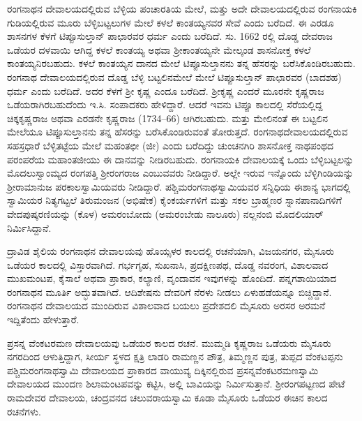 ರಂಗನಾಥನ ದೇವಾಲಯದಲ್ಲಿರುವ ಬೆಳ್ಳಿಯ ಪಂಚಾರತಿಯ ಮೇಲೆ, ಮತ್ತು ಅದೇ ದೇವಾಲಯದಲ್ಲಿರುವ ರಂಗನಾಯಕಿ ಗುಡಿಯಲ್ಲಿರುವ ಮೂರು ಬೆಳ್ಳಿಬಟ್ಟಲುಗಳ ಮೇಲೆ ಕಳಲೆ ಕಾಂತಯ್ಯನವರ ಸೇವೆ ಎಂದು ಬರೆದಿದೆ. ಈ ಎರಡೂ ಶಾಸನಗಳ ಕೆಳಗೆ ಟಿಪ್ಪೂಸುಲ್ತಾನ್​ ಪಾಛಾರವರ ಧರ್ಮ ಎಂದು ಬರೆದಿದೆ. ಸು. 1662 ರಲ್ಲಿ ದೊಡ್ಡ ದೇವರಾಜ ಒಡೆಯರ ದಳವಾಯಿ ಆಗಿದ್ದ ಕಳಲೆ ಕಾಂತಯ್ಯ ಅಥವಾ ಶ‍್ರೀಕಾಂತಯ್ಯನೇ ಮೇಲ್ಕಂಡ ಶಾಸನೋಕ್ತ ಕಳಲೆ ಕಾಂತಯ್ಯನಿರಬಹುದು. ಕಳಲೆ ಕಾಂತಯ್ಯನ ದಾನದ ಮೇಲೆ ಟಿಪ್ಪೂಸುಲ್ತಾನನು ತನ್ನ ಹೆಸರನ್ನು ಬರೆಸಿಕೊಂಡಿರಬಹುದು. ರಂಗನಾಥ ದೇವಾಲಯದಲ್ಲಿರುವ ದೊಡ್ಡ ಬೆಳ್ಳಿ ಬಟ್ಟಲಿನಮೇಲೆ ಮೇಲೆ ಟಿಪ್ಪೂಸುಲ್ತಾನ್​ ಪಾಛಾರವರ (ಬಾದಶಹ) ಧರ್ಮ ಎಂದು ಬರೆದಿದೆ. ಅದರ ಕೆಳಗೆ ಶ‍್ರೀ ಕೃಷ್ಣ ಎಂದೂ ಬರೆದಿದೆ. ಶ‍್ರೀಕೃಷ್ಣ ಎಂದರೆ ಮೂರನೇ ಕೃಷ್ಣರಾಜ ಒಡೆಯರಾಗಿರಬಹುದೆಂದು ಇ.ಸಿ. ಸಂಪಾದಕರು ಹೇಳಿದ್ದಾರೆ. ಆದರೆ ಇವನು ಟಿಪ್ಪೂ ಕಾಲದಲ್ಲಿ ಸೆರೆಯಲ್ಲಿದ್ದ ಚಿಕ್ಕಕೃಷ್ಣರಾಜ ಅಥವಾ ಎರಡನೇ ಕೃಷ್ಣರಾಜ (1734–66) ಆಗಿರಬಹುದು. ಮತ್ತು ಮೇಲಿನಂತೆ ಈ ಬಟ್ಟಲಿನ ಮೇಲೆಯೂ ಟಿಪ್ಪೂಸುಲ್ತಾನನು ತನ್ನ ಹೆಸರನ್ನು ಬರೆಸಿಕೊಂಡಿರುವಂತೆ ತೋರುತ್ತದೆ. ರಂಗನಾಥದೇವಾಲಯದಲ್ಲಿರುವ ಸಹಸ್ರಧಾರೆ ಬೆಳ್ಳಿತಟ್ಟೆಯ ಮೇಲೆ ಮಹಂತಛೀ (ಜೀ) ಎಂದು ಬರೆದಿದ್ದು ಚುಂಚನಗಿರಿ ಶಾಸನೋಕ್ತ ನಾಥಪಂಥದ ಪರಂಪರೆಯ ಮಹಾಂತಜೀಯು ಈ ದಾನವನ್ನು ನೀಡಿರಬಹುದು. ರಂಗನಾಯಕಿ ದೇವಾಲಯಕ್ಕೆ ಒಂದು ಬೆಳ್ಳಿಬಟ್ಟಲನ್ನು ಮೊದಲುಸ್ವಾಂಮ್ಯದ ರಂಗಪತ್ತಿ ಶ‍್ರೀರಂಗರಾಜ ಎಂಬುವವರು ನೀಡಿದ್ದಾರೆ. ಅಲ್ಲೇ ಇರುವ ಇನ್ನೊಂದು ಬೆಳ್ಳಿಗಿಂಡಿಯನ್ನು ಶ‍್ರೀರಾಮಾನುಜ ಪರಕಾಲಸ್ವಾಮಿಯವರು ನೀಡಿದ್ದಾರೆ. ಪಶ್ಚಿಮರಂಗನಾಥಸ್ವಾಮಿಯವರ ಸನ್ನಿಧಿಯ ಈಶಾನ್ಯ ಭಾಗದಲ್ಲಿ ಸ್ವಾಮಿಯರ ನಿತ್ಯಗಟ್ಟಲೆ ತಿರುಮಂಜನ (ಅಭಿಷೇಕ) ಕೈಂಕರ್ಯಗಳಿಗೆ ಮತ್ತು ಸಕಲ ಬ್ರಾಹ್ಮಣರ ಸ್ನಾನಪಾನಾದಿಗಳಿಗೆ ವೇದಪುಷ್ಕರಣಿಯನ್ನು (ಕೊಳ) ಅಮರಂಬೋದು (ಅಮರಂಬೇಡು ನಾಲೂರು) ನಲ್ಲನಂಬಿ ಮೊದಲಿಯಾರ್​ ನಿರ್ಮಿಸಿದ್ದಾನೆ.

ದ್ರಾವಿಡ ಶೈಲಿಯ ರಂಗನಾಥನ ದೇವಾಲಯವು ಹೊಯ್ಸಳರ ಕಾಲದಲ್ಲಿ ರಚನೆಯಾಗಿ, ವಿಜಯನಗರ, ಮೈಸೂರು ಒಡೆಯರ ಕಾಲದಲ್ಲಿ ವಿಸ್ತಾರವಾಗಿದೆ. ಗರ್ಭಗೃಹ, ಸುಖನಾಸಿ, ಪ್ರದಕ್ಷಿಣಪಥ, ದೊಡ್ಡ ನವರಂಗ, ವಿಶಾಲವಾದ ಮುಖಮಂಟಪ, ಕೈಸಾಲೆ ಅಥವಾ ಪ್ರಾಕಾರ, ಕಲ್ಯಾಣಿ, ವೃಂದಾವನ ಇವುಗಳನ್ನು ಹೊಂದಿದೆ. ಪನ್ನಗಶಾಯಿಯಾದ ರಂಗನಾಥನ ಮೂರ್ತಿ ಅದ್ಭುತವಾಗಿದೆ. ಆದಿಶೇಷನು ದೇವರಿಗೆ ನೆರಳು ನೀಡಲು ಏಳುಹಡೆಯನ್ನೂ ಬಿಚ್ಚಿದ್ದಾನೆ. ರಂಗನಾಥನ ದೇವಾಲಯದ ಮುಂದಿರುವ ವಿಶಾಲವಾದ ಬಯಲು ಪ್ರದೇಶದಲಿ ಮೈಸೂರು ಅರಸರ ಅರಮನೆ ಇದ್ದಿತೆಂದು ಹೇಳುತ್ತಾರೆ.

ಪ್ರಸನ್ನ ವೆಂಕಟರಮಣ ದೇವಾಲಯವು ಒಡೆಯರ ಕಾಲದ ರಚನೆ. ಮುಮ್ಮಡಿ ಕೃಷ್ಣರಾಜ ಒಡೆಯರು ಮೈಸೂರು ನಗರದಿಂದ ಆಳುತ್ತಿದ್ದಾಗ, ಸೀರ್ಯ ಸ್ಥಳದ ಕ್ಷತ್ರಿ ಲಾಡರಿ ರಾಮಣ್ಣನ ಪೌತ್ರ, ತಿಮ್ಮಣ್ಣನ ಪುತ್ರ, ತುಪ್ಪದ ವೆಂಕಟಪ್ಪನು ಪಶ್ಚಿಮರಂಗನಾಥಸ್ವಾಮಿ ದೇವಾಲಯದ ಪ್ರಾಕಾರದ ವಾಯುವ್ಯ ದಿಕ್ಕಿನಲ್ಲಿರುವ ಪ್ರಸನ್ನವೆಂಕಟರಮಣಸ್ವಾಮಿ ದೇವಾಲಯದ ಮುಂದಣ ಶಿಲಾಮಂಟಪವನ್ನು ಕಟ್ಟಿಸಿ, ಅಲ್ಲಿ ಬಾವಿಯನ್ನು ನಿರ್ಮಿಸುತ್ತಾನೆ. ಶ‍್ರೀರಂಗಪಟ್ಟಣದ ಪೇಟೆ ರಾಮದೇವರ ದೇವಾಲಯ, ಚಂದ್ರವನದ ಚಲುವರಾಯಸ್ವಾಮಿ ಕೂಡಾ ಮೈಸೂರು ಒಡೆಯರ ಈಚಿನ ಕಾಲದ ರಚನೆಗಳು.


